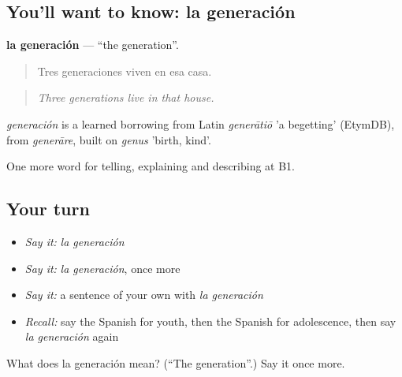 \subsection*{You'll want to know: la generación}
\textbf{la generación} — \textquotedblleft{}the generation\textquotedblright{}.

\begin{quote}
Tres generaciones viven en esa casa.
\end{quote}

\begin{quote}
\emph{Three generations live in that house.}
\end{quote}

\begin{cousinweb}
\emph{generación} is a learned borrowing from Latin \emph{generātiō} 'a begetting' (EtymDB), from \emph{generāre}, built on \emph{genus} 'birth, kind'.
\end{cousinweb}

\begin{grammarlens}[title={What you've built}]
One more word for telling, explaining and describing at B1.
\end{grammarlens}

\subsection*{Your turn}
\begin{itemize}
\raggedright
  \item \emph{Say it:} \emph{la generación}
  \item \emph{Say it:} \emph{la generación}, once more
  \item \emph{Say it:} a sentence of your own with \emph{la generación}
  \item \emph{Recall:} say the Spanish for youth, then the Spanish for adolescence, then say \emph{la generación} again
\end{itemize}

\begin{tcolorbox}[breakable,colback=teal!4,colframe=teal!35!black,title={Before you move on}]
What does la generación mean? (\textquotedblleft{}The generation\textquotedblright{}.) Say it once more.
\end{tcolorbox}
